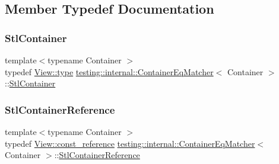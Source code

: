 \subsection{Member Typedef Documentation}
\mbox{\label{classtesting_1_1internal_1_1_container_eq_matcher_a8352d0190c372578d9a9a8457e0810db}} 
\subsubsection{\texorpdfstring{Stl\+Container}{StlContainer}}
{\footnotesize\ttfamily template$<$typename Container $>$ \\
typedef \hyperlink{classtesting_1_1internal_1_1_stl_container_view_a2b2c63a6dcdbfe63fb0ee121ebf463ba}{View\+::type} \hyperlink{classtesting_1_1internal_1_1_container_eq_matcher}{testing\+::internal\+::\+Container\+Eq\+Matcher}$<$ Container $>$\+::\hyperlink{classtesting_1_1internal_1_1_container_eq_matcher_a8352d0190c372578d9a9a8457e0810db}{Stl\+Container}}

\mbox{\label{classtesting_1_1internal_1_1_container_eq_matcher_aaaeaacf0c557fe701a83e108d47edb23}} 
\subsubsection{\texorpdfstring{Stl\+Container\+Reference}{StlContainerReference}}
{\footnotesize\ttfamily template$<$typename Container $>$ \\
typedef \hyperlink{classtesting_1_1internal_1_1_stl_container_view_a9cd4f6ed689b3938cdb7b3c4cbf1b36b}{View\+::const\+\_\+reference} \hyperlink{classtesting_1_1internal_1_1_container_eq_matcher}{testing\+::internal\+::\+Container\+Eq\+Matcher}$<$ Container $>$\+::\hyperlink{classtesting_1_1internal_1_1_container_eq_matcher_aaaeaacf0c557fe701a83e108d47edb23}{Stl\+Container\+Reference}}

